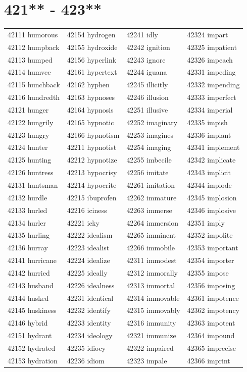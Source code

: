 \documentclass[10pt, oneside]{book}
\begin{document}
\begin{table}
	\centering
	\section*{421** - 423**}
	\begin{tabular}{l l l l}
42111 humorous &42154 hydrogen &42241 idly &42324 impart\\
42112 humpback &42155 hydroxide &42242 ignition &42325 impatient\\
42113 humped &42156 hyperlink &42243 ignore &42326 impeach\\
42114 humvee &42161 hypertext &42244 iguana &42331 impeding\\
42115 hunchback &42162 hyphen &42245 illicitly &42332 impending\\
42116 hundredth &42163 hypnoses &42246 illusion &42333 imperfect\\
42121 hunger &42164 hypnosis &42251 illusive &42334 imperial\\
42122 hungrily &42165 hypnotic &42252 imaginary &42335 impish\\
42123 hungry &42166 hypnotism &42253 imagines &42336 implant\\
42124 hunter &42211 hypnotist &42254 imaging &42341 implement\\
42125 hunting &42212 hypnotize &42255 imbecile &42342 implicate\\
42126 huntress &42213 hypocrisy &42256 imitate &42343 implicit\\
42131 huntsman &42214 hypocrite &42261 imitation &42344 implode\\
42132 hurdle &42215 ibuprofen &42262 immature &42345 implosion\\
42133 hurled &42216 iciness &42263 immerse &42346 implosive\\
42134 hurler &42221 icky &42264 immersion &42351 imply\\
42135 hurling &42222 idealism &42265 imminent &42352 impolite\\
42136 hurray &42223 idealist &42266 immobile &42353 important\\
42141 hurricane &42224 idealize &42311 immodest &42354 importer\\
42142 hurried &42225 ideally &42312 immorally &42355 impose\\
42143 husband &42226 idealness &42313 immortal &42356 imposing\\
42144 husked &42231 identical &42314 immovable &42361 impotence\\
42145 huskiness &42232 identify &42315 immovably &42362 impotency\\
42146 hybrid &42233 identity &42316 immunity &42363 impotent\\
42151 hydrant &42234 ideology &42321 immunize &42364 impound\\
42152 hydrated &42235 idiocy &42322 impaired &42365 imprecise\\
42153 hydration &42236 idiom &42323 impale &42366 imprint\\
	\end{tabular}
 \end{table}
\clearpage
\end{document}
